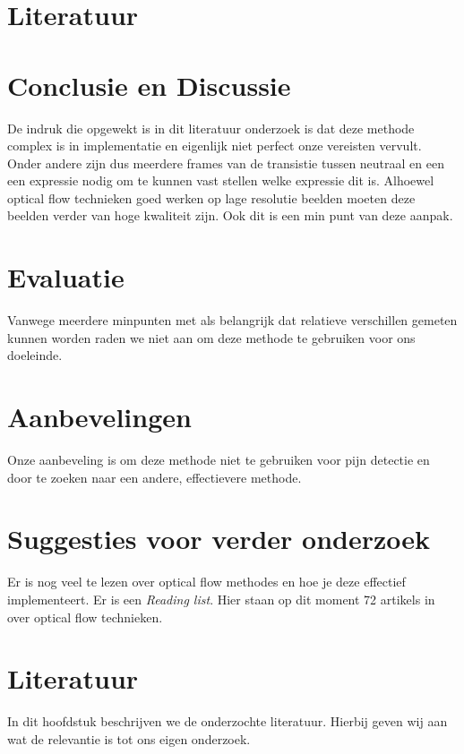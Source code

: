 \documentclass[11pt]{article}
\begin{document}
    \section{Literatuur}\label{sec:literatuur}


    
    \section{Conclusie en Discussie}\label{sec:conclusie-en-discussie}
    De indruk die opgewekt is in dit literatuur onderzoek is dat deze methode complex is in implementatie en eigenlijk niet perfect onze vereisten vervult.
    Onder andere zijn dus meerdere frames van de transistie tussen neutraal en een een expressie nodig om te kunnen vast stellen welke expressie dit is.
    Alhoewel optical flow technieken goed werken op lage resolutie beelden moeten deze beelden verder van hoge kwaliteit zijn.
    Ook dit is een min punt van deze aanpak.


    \section{Evaluatie}\label{sec:evaluatie2}
    Vanwege meerdere minpunten met als belangrijk dat relatieve verschillen gemeten kunnen worden raden we niet aan om deze methode te gebruiken voor ons doeleinde.


    \section{Aanbevelingen}\label{sec:aanbevelingen2}
    Onze aanbeveling is om deze methode niet te gebruiken voor pijn detectie en door te zoeken naar een andere, effectievere methode.


    \section{Suggesties voor verder onderzoek}\label{sec:suggesties-voor-verder-onderzoek2}
    Er is nog veel te lezen over optical flow methodes en hoe je deze effectief implementeert.
    Er is een \emph{\citet{Readinglist} Reading list}.
    Hier staan op dit moment 72 artikels in over optical flow technieken.


    \section{Literatuur}\label{sec:literatuur2}
    In dit hoofdstuk beschrijven we de onderzochte literatuur.
    Hierbij geven wij aan wat de relevantie is tot ons eigen onderzoek.



    

    
\end{document}
